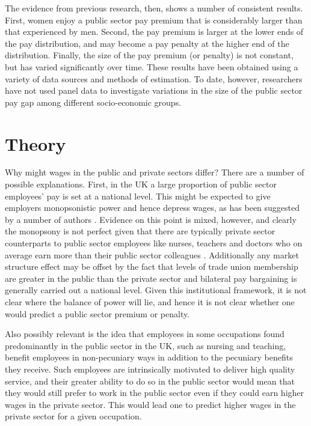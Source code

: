 \documentclass[a4paper,11pt,titlepage]{article}
\begin{document}
The evidence from previous research, then, shows a number of consistent results. First, women enjoy a public sector pay premium that is considerably larger than that experienced by men.  Second, the pay premium is larger at the lower ends of the pay distribution, and may become a pay penalty at the higher end of the distribution.  Finally, the size of the pay premium (or penalty) is not constant, but has varied significantly over time.  These results have been obtained using a variety of data sources and methods of estimation.  To date, however, researchers have not used panel data to investigate variations in the size of the public sector pay gap among different socio-economic groups.

\section{Theory}

Why might wages in the public and private sectors differ? There are a number of possible explanations.  First, in the UK a large proportion of public sector employees' pay is set at a national level.  This might be expected to give employers monopsonistic power and hence depress wages, as has been suggested by a number of authors \citep{Boal1997}.  Evidence on this point is mixed, however, and clearly the monopsony is not perfect given that there are typically private sector counterparts to public sector employees like nurses, teachers and doctors who on average earn more than their public sector colleagues \citep{Barron2012}. Additionally any market structure effect may be offset by the fact that levels of trade union membership are greater in the public than the private sector and bilateral pay bargaining is generally carried out a national level.  Given this institutional framework, it is not clear where the balance of power will lie, and hence it is not clear whether one would predict a public sector premium or penalty.

Also possibly relevant is the idea that employees in some occupations found predominantly in the public sector in the UK, such as nursing and teaching, benefit employees in non-pecuniary ways in addition to the pecuniary benefits they receive.  Such employees are intrinsically motivated to deliver high quality service, and their greater ability to do so in the public sector would mean that they would still prefer to work in the public sector even if they could earn higher wages in the private sector.  This would lead one to predict higher wages in the private sector for a given occupation.
\end{document}
